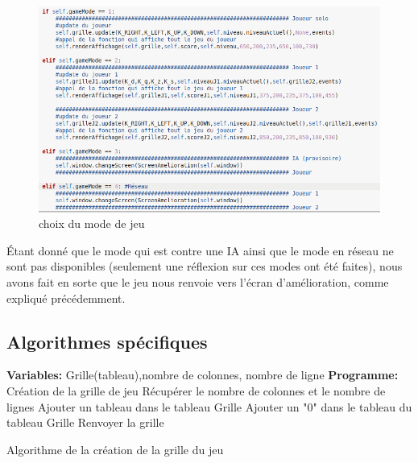 \documentclass[a4paper, 11pt]{article}
\begin{document}
\begin{itemize}
\begin{itemize}
                 \begin{figure}[ht]
                    \centering
                    \includegraphics[scale=0.5]{images/gameMode.png}
                    \caption{choix du mode de jeu}
                \end{figure}
                
                Étant donné que le mode qui est contre une IA ainsi que le mode en réseau ne sont pas disponibles (seulement une réflexion sur ces modes ont été faites), nous avons fait en sorte que le jeu nous renvoie vers l'écran d'amélioration, comme expliqué précédemment.
                
            	\end{itemize}
            		
        	\end{itemize}
        	\newpage
        \subsection{Algorithmes spécifiques}
    		\begin{algorithm}
     			\centering
     			\begin{algorithmic}[1]
      				\STATE \textbf{Variables:} Grille(tableau),nombre de colonnes, nombre de ligne
      				\STATE \textbf{Programme:} Création de la grille de jeu
      				\STATE Récupérer le nombre de colonnes et le nombre de lignes
      					\STATE  Ajouter un tableau dans le tableau Grille
      						\STATE Ajouter un "0" dans le tableau du tableau Grille
      					\ENDFOR
      				\ENDFOR
      				\STATE Renvoyer la grille
     			\end{algorithmic}
     			\caption{Algorithme de la création de la grille du jeu}
     		\end{algorithm}
    			     	
\end{document}
